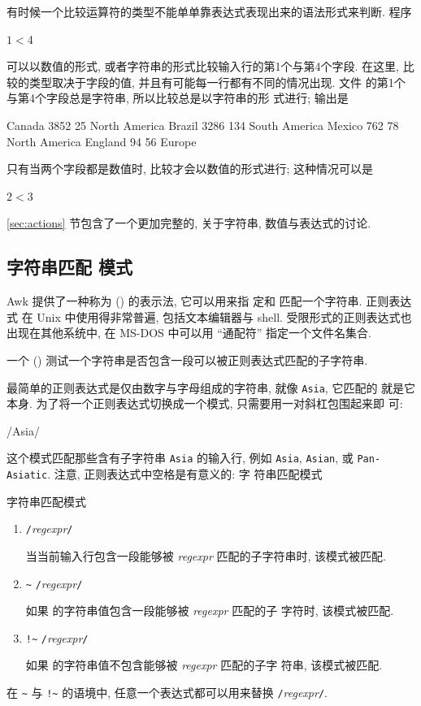 有时候一个比较运算符的类型不能单单靠表达式表现出来的语法形式来判断. 程序
\begin{awkcode}
    $1 < $4
\end{awkcode}
可以以数值的形式, 或者字符串的形式比较输入行的第1个与第4个字段. 在这里,
比较的类型取决于字段的值, 并且有可能每一行都有不同的情况出现. 文件
 的第1个与第4个字段总是字符串, 所以比较总是以字符串的形
式进行; 输出是
\begin{awkcode}
    Canada      3852    25      North America
    Brazil      3286    134     South America
    Mexico      762     78      North America
    England     94      56      Europe
\end{awkcode}
只有当两个字段都是数值时, 比较才会以数值的形式进行; 这种情况可以是
\begin{awkcode}
    $2 < $3
\end{awkcode}

\ref{sec:actions} 节包含了一个更加完整的, 关于字符串, 数值与表达式的讨论.

\subsection{字符串匹配 模式}
\label{subsec:string_matching_pattern}

Awk 提供了一种称为  (\regexpr) 的表示法, 它可以用来指
定和
匹配一个字符串.  正则表达式 在 Unix 中使用得非常普遍, 包括文本编辑器与
shell. 受限形式的正则表达式也出现在其他系统中, 在 MS-DOS 中可以用
``通配符'' 指定一个文件名集合.

一个  ()
测试一个字符串是否包含一段可以被正则表达式匹配的子字符串.

最简单的正则表达式是仅由数字与字母组成的字符串, 就像 \verb'Asia', 它匹配的
就是它本身. 为了将一个正则表达式切换成一个模式, 只需要用一对斜杠包围起来即
可:
\begin{awkcode}
    /Asia/
\end{awkcode}
这个模式匹配那些含有子字符串 \verb'Asia' 的输入行, 例如 \verb'Asia',
\verb'Asian', 或 \verb'Pan-Asiatic'. 注意, 正则表达式中空格是有意义的: 字
符串匹配模式
\begin{summary}{字符串匹配模式}
    \begin{enumerate}
        \item \verb'/'\textit{regexpr}\verb'/' \par
            当当前输入行包含一段能够被 \textit{regexpr} 匹配的子字符串时,
            该模式被匹配.
        \item \expr {} \verb'~' \verb'/'\textit{regexpr}\verb'/' \par
            如果 \expr 的字符串值包含一段能够被 \textit{regexpr} 匹配的子
            字符时, 该模式被匹配.
        \item \expr {} \verb'!~' \verb'/'\textit{regexpr}\verb'/' \par
            如果 \expr 的字符串值不包含能够被 \textit{regexpr} 匹配的子字
            符串, 该模式被匹配.
    \end{enumerate}
    在 \verb'~' 与 \verb'!~' 的语境中, 任意一个表达式都可以用来替换
    \verb'/'\textit{regexpr}\verb'/'.
\end{summary}

